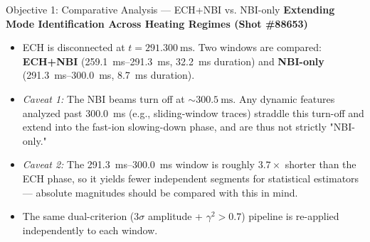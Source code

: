 \documentclass[aspectratio=169]{beamer}
\begin{document}
\begin{frame}{Objective 1: Comparative Analysis --- ECH+NBI vs. NBI-only}
    \textbf{Extending Mode Identification Across Heating Regimes (Shot \#88653)}
    \begin{itemize}
        \item ECH is disconnected at $t = \SI{291.300}{\milli\second}$. Two windows are compared: \textbf{ECH+NBI} (\SIrange{259.1}{291.3}{\milli\second}, \SI{32.2}{\milli\second} duration) and \textbf{NBI-only} (\SIrange{291.3}{300.0}{\milli\second}, \SI{8.7}{\milli\second} duration).
        \item \textit{Caveat 1:} The NBI beams turn off at $\sim\SI{300.5}{\milli\second}$. Any dynamic features analyzed past \SI{300.0}{\milli\second} (e.g., sliding-window traces) straddle this turn-off and extend into the fast-ion slowing-down phase, and are thus not strictly "NBI-only."
        \item \textit{Caveat 2:} The \SIrange{291.3}{300.0}{\milli\second} window is roughly $3.7\times$ shorter than the ECH phase, so it yields fewer independent segments for statistical estimators — absolute magnitudes should be compared with this in mind.
        \item The same dual-criterion ($3\sigma$ amplitude + $\gamma^2 > 0.7$) pipeline is re-applied independently to each window.
    \end{itemize}
\end{frame}
\end{document}
